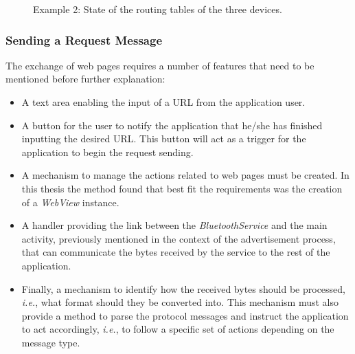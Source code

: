 \begin{figure}[ht]
	\noindent{}
	\caption{\label{fig:example1.0} Example 2: State of the routing tables of the three devices.}
\end{figure}

\subsubsection{Sending a Request Message}
\label{subsubsec:sendrqt}

The exchange of web pages requires a number of features that need to be mentioned before further explanation:

\begin{itemize}
	\item  A text area enabling the input of a \gls{URL} from the application user.
	
	\item A button for the user to notify the application that he/she has finished inputting the desired \gls{URL}. This button will act as a trigger for the application to begin the request sending.
	
	\item A mechanism to manage the actions related to web pages must be created. In this thesis the method found that best fit the requirements was the creation of a \textit{WebView} instance.
	
	\item A handler providing the link between the \textit{BluetoothService} and the main activity, previously mentioned in the context of the advertisement process, that can communicate the bytes received by the service to the rest of the application.
	
	\item Finally, a mechanism to identify how the received bytes should be processed, \textit{i.e.}, what format should they be converted into. This mechanism must also provide a method to parse the protocol messages and instruct the application to act accordingly, \textit{i.e.}, to follow a specific set of actions depending on the message type.
\end{itemize}

